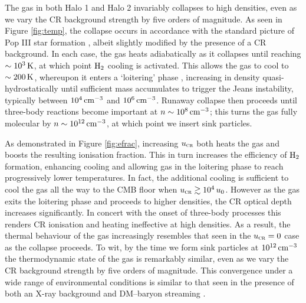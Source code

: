 \documentclass[../thesis.tex]{subfiles}
\begin{document}
The gas in both Halo 1 and Halo 2 invariably collapses to high densities, even as we vary the CR background strength by five orders of magnitude. 
As seen in Figure \ref{fig:temp}, the collapse occurs in accordance with the standard picture of Pop III star formation \citep[e.g.,][]{Greifetal2012,StacyBromm2013,Hiranoetal2014,Hosokawaetal2015}, albeit slightly modified by the presence of a CR background.  
In each case, the gas heats adiabatically as it collapses until reaching $\sim10^3\kelvin$, at which point $\htwo$ cooling is activated.  
This allows the gas to cool to $\sim200\kelvin$, whereupon it enters a `loitering' phase \citep{BrommCoppiLarson2002}, increasing in density quasi-hydrostatically until sufficient mass accumulates to trigger the Jeans instability, typically between $10^4\cc$ and $10^6\cc$. 
Runaway collapse then proceeds until three-body reactions become important at $n\sim10^8\cc$; this turns the gas fully molecular by $n\sim10^{12}\cc$, at which point we insert sink particles.

As demonstrated in Figure \ref{fig:efrac}, increasing $\ucr$ both heats the gas and boosts the resulting ionisation fraction.
This in turn increases the efficiency of $\htwo$ formation, enhancing cooling and allowing gas in the loitering phase to reach progressively lower temperatures. 
In fact, the additional cooling is sufficient to cool the gas all the way to the CMB floor when $\ucr \gtrsim 10^4\,u_0$. 
However as the gas exits the loitering phase and proceeds to higher densities, the CR optical depth increases significantly. 
In concert with the onset of three-body processes this renders CR ionisation and heating ineffective at high densities. 
As a result, the thermal behaviour of the gas increasingly resembles that seen in the $\ucr=0$ case as the collapse proceeds. 
To wit, by the time we form sink particles at  $10^{12}\cc$ the thermodynamic state of the gas is remarkably similar, even as we vary the CR background strength by five orders of magnitude.
This convergence under a wide range of environmental conditions is similar to that seen in the presence of both an X-ray background \citep{Hummeletal2015} and DM--baryon streaming \citep{StacyBrommLoeb2011a,Greifetal2011b}.
\end{document}
